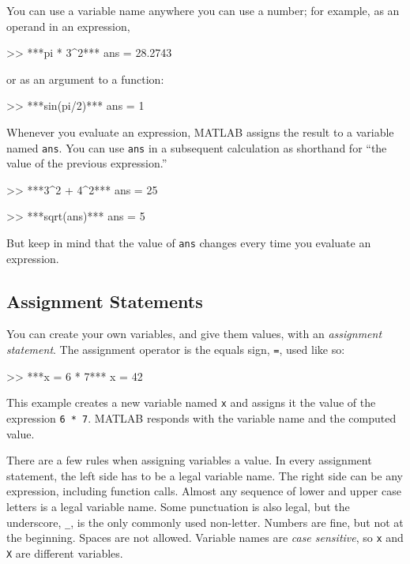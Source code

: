 You can use a variable name anywhere you can use a number; for example, as
an operand in an expression,

\begin{code}
>> ***pi * 3^2***
ans = 28.2743
\end{code}
or as an argument to a function:

\begin{code}
>> ***sin(pi/2)***
ans = 1
\end{code}


Whenever you evaluate an expression, MATLAB assigns the result to
a variable named \lstinline{ans}.  You can use \lstinline{ans} in a subsequent
calculation as shorthand for ``the value of the previous expression.''

\begin{code}
>> ***3^2 + 4^2***
ans = 25

>> ***sqrt(ans)***
ans = 5
\end{code}

But keep in mind that the value of \lstinline{ans} changes every time
you evaluate an expression.


\subsection{Assignment Statements}

You can create your own variables, and give them values, with
an \emph{assignment statement}.  The assignment operator is the
equals sign, \lstinline{=}, used like so:


\begin{code}
>> ***x = 6 * 7***
x = 42
\end{code}
This example creates a new variable named \lstinline{x} and assigns it the
value of the expression \lstinline{6 * 7}.  MATLAB responds with the
variable name and the computed value.


There are a few rules when assigning variables a value. In every assignment statement, the left side has to be a legal variable name.  The right side can be any expression, including function calls.
%
%
%
%
Almost any sequence of lower and upper case letters is a legal
variable name.  
Some punctuation is also legal, but the underscore,
\lstinline{_}, is the only commonly used non-letter.
Numbers are fine, but not at the beginning.  
Spaces are not allowed.  Variable names are
\emph{case sensitive}, so \lstinline{x} and \lstinline{X} are different variables.

